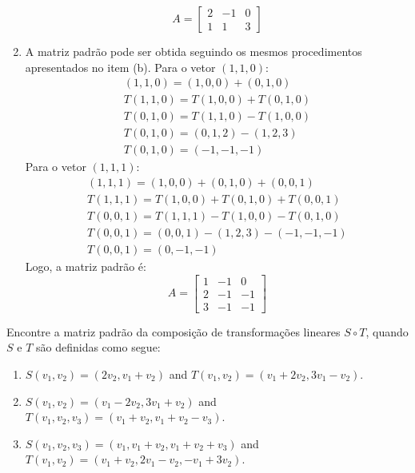 \begin{resolution}
\begin{enumerate}[label=\alph*)]
          \begin{equation}
            A = \begin{bmatrix}
              2 & -1 & 0 \\
              1 & 1  & 3
            \end{bmatrix}
          \end{equation}
    \item A matriz padrão pode ser obtida seguindo os mesmos procedimentos apresentados no item (b). Para o vetor $(1, 1, 0)$:
          \begin{gather}
            (1,1,0) = (1,0,0) + (0,1,0) \\
            T(1,1,0) = T(1,0,0) + T(0,1,0) \\
            T(0,1,0) = T(1,1,0) - T(1,0,0) \\
            T(0,1,0) = (0,1,2) - (1,2,3) \\
            T(0,1,0) = (-1, -1, -1)
          \end{gather}
          Para o vetor $(1, 1, 1)$:
          \begin{gather}
            (1, 1, 1) = (1, 0, 0) + (0, 1, 0) + (0, 0, 1) \\
            T(1, 1, 1) = T(1, 0, 0) + T(0, 1, 0) + T(0, 0, 1) \\
            T(0, 0, 1) = T(1, 1, 1) - T(1, 0, 0) - T(0, 1, 0)  \\
            T(0,0,1) = (0,0,1) - (1, 2, 3) - (-1, -1, -1) \\
            T(0,0,1) = (0, -1, -1)
          \end{gather}
          Logo, a matriz padrão é:
          \begin{equation}
            A = \begin{bmatrix}
              1 & -1 & 0  \\
              2 & -1 & -1 \\
              3 & -1 & -1
            \end{bmatrix}
          \end{equation}
  \end{enumerate}
\end{resolution}

\begin{question}
  Encontre a matriz padrão da composição de transformações lineares $S \circ T$, quando $S$ e $T$ são definidas como segue:
  \begin{enumerate}[label=\alph*)]
    \item $S(v_1, v_2) = (2v_2, v_1 + v_2)$ and $T(v_1, v_2) = (v_1 + 2v_2, 3v_1 - v_2)$.
    \item $S(v_1, v_2) = (v_1 - 2 v_2, 3v_1 + v_2)$ and $T(v_1, v_2, v_3) = (v_1 + v_2, v_1 + v_2 - v_3)$.
    \item $S(v_1, v_2, v_3) = (v_1, v_1 + v_2, v_1 + v_2 + v_3)$ and $T(v_1, v_2) = (v_1 + v_2, 2v_1 - v_2, -v_1 + 3v_2)$.
  \end{enumerate}
\end{question}

